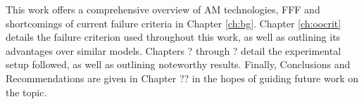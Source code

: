 \documentclass[main.tex]{subfiles}
\begin{document}
This work offers a comprehensive overview of AM technologies, FFF and shortcomings of current failure criteria in Chapter \ref{ch:bg}. Chapter \ref{ch:oocrit} details the failure criterion used throughout this work, as well as outlining its advantages over similar models. Chapters ? through ? detail the experimental setup followed, as well as outlining noteworthy results. Finally, Conclusions and Recommendations are given in Chapter ?? in the hopes of guiding future work on the topic. %

% 
%
%
%
\end{document}
